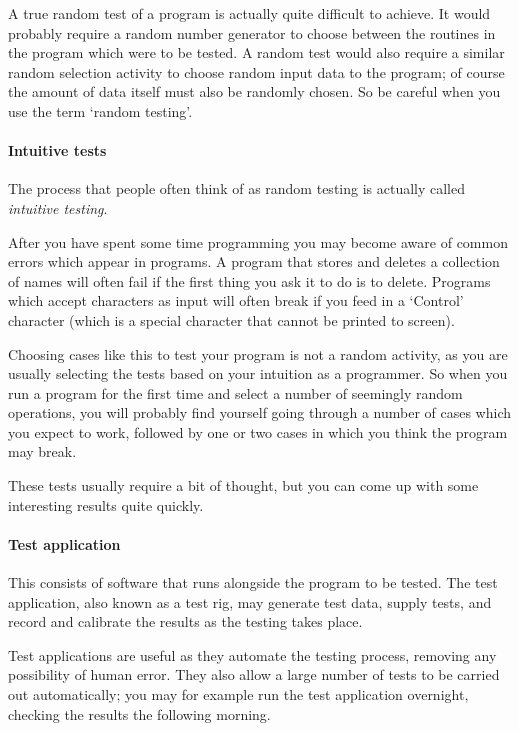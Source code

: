 A true random test of a program is actually quite difficult to 
achieve. It would probably require a random number generator to 
choose between the routines in the program which were to be  
tested. A random test would also require a similar random 
selection activity to choose random input data to the program;
of course the amount of data itself must also be randomly chosen.
So be careful when you use the term `random testing'.
 
\paragraph{Intuitive tests} The process that people often think of as
random testing is actually called {\it intuitive testing}.  

After you have spent some time programming you may become aware of common
errors which appear in programs. A program that stores and deletes a 
collection of names will often fail if the first thing you ask it to 
do is to delete. Programs which accept characters as input will often
break  if you feed in a `Control' character (which is a special
character that cannot be printed 
to screen).

Choosing cases like this to test your program is not a random 
activity, as you are usually selecting the tests based on your 
intuition as a programmer. So when you run a program for the 
first time and select a number of seemingly random operations, 
you will probably find yourself going through a number of cases
which you expect to work, followed by one or two cases in which 
you think the program may break. 

These tests usually require a bit of 
thought, but you can come up with some interesting results quite quickly. 
 

\paragraph{Test application} This consists of
software that runs alongside the program to be tested. The test
application, also known as a test rig, may  generate test data, supply
tests, and record and 
calibrate the  results as the testing takes place.

Test applications are useful as they automate  
the testing process, removing any possibility of human error.
They also allow a large number of tests to be carried out 
automatically; you may for example run the test application overnight,
checking the  results the following morning.  

